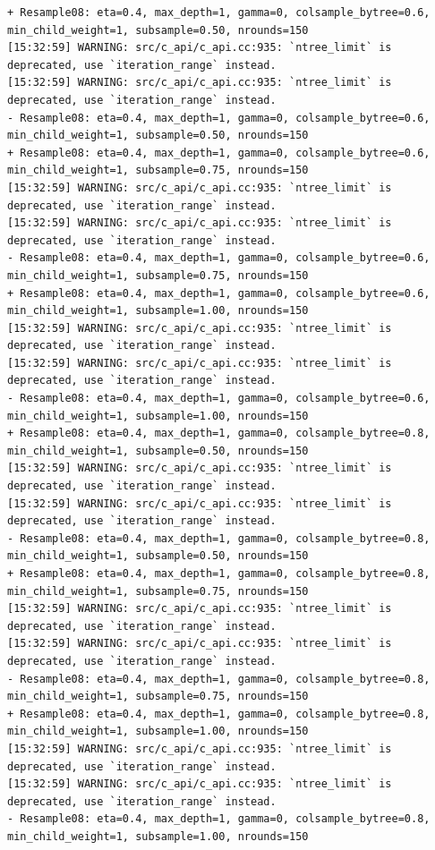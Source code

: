 \documentclass[
  letterpaper,
  DIV=11,
  numbers=noendperiod]{scrartcl}
\begin{document}
\begin{verbatim}
+ Resample08: eta=0.4, max_depth=1, gamma=0, colsample_bytree=0.6, min_child_weight=1, subsample=0.50, nrounds=150 
[15:32:59] WARNING: src/c_api/c_api.cc:935: `ntree_limit` is deprecated, use `iteration_range` instead.
[15:32:59] WARNING: src/c_api/c_api.cc:935: `ntree_limit` is deprecated, use `iteration_range` instead.
- Resample08: eta=0.4, max_depth=1, gamma=0, colsample_bytree=0.6, min_child_weight=1, subsample=0.50, nrounds=150 
+ Resample08: eta=0.4, max_depth=1, gamma=0, colsample_bytree=0.6, min_child_weight=1, subsample=0.75, nrounds=150 
[15:32:59] WARNING: src/c_api/c_api.cc:935: `ntree_limit` is deprecated, use `iteration_range` instead.
[15:32:59] WARNING: src/c_api/c_api.cc:935: `ntree_limit` is deprecated, use `iteration_range` instead.
- Resample08: eta=0.4, max_depth=1, gamma=0, colsample_bytree=0.6, min_child_weight=1, subsample=0.75, nrounds=150 
+ Resample08: eta=0.4, max_depth=1, gamma=0, colsample_bytree=0.6, min_child_weight=1, subsample=1.00, nrounds=150 
[15:32:59] WARNING: src/c_api/c_api.cc:935: `ntree_limit` is deprecated, use `iteration_range` instead.
[15:32:59] WARNING: src/c_api/c_api.cc:935: `ntree_limit` is deprecated, use `iteration_range` instead.
- Resample08: eta=0.4, max_depth=1, gamma=0, colsample_bytree=0.6, min_child_weight=1, subsample=1.00, nrounds=150 
+ Resample08: eta=0.4, max_depth=1, gamma=0, colsample_bytree=0.8, min_child_weight=1, subsample=0.50, nrounds=150 
[15:32:59] WARNING: src/c_api/c_api.cc:935: `ntree_limit` is deprecated, use `iteration_range` instead.
[15:32:59] WARNING: src/c_api/c_api.cc:935: `ntree_limit` is deprecated, use `iteration_range` instead.
- Resample08: eta=0.4, max_depth=1, gamma=0, colsample_bytree=0.8, min_child_weight=1, subsample=0.50, nrounds=150 
+ Resample08: eta=0.4, max_depth=1, gamma=0, colsample_bytree=0.8, min_child_weight=1, subsample=0.75, nrounds=150 
[15:32:59] WARNING: src/c_api/c_api.cc:935: `ntree_limit` is deprecated, use `iteration_range` instead.
[15:32:59] WARNING: src/c_api/c_api.cc:935: `ntree_limit` is deprecated, use `iteration_range` instead.
- Resample08: eta=0.4, max_depth=1, gamma=0, colsample_bytree=0.8, min_child_weight=1, subsample=0.75, nrounds=150 
+ Resample08: eta=0.4, max_depth=1, gamma=0, colsample_bytree=0.8, min_child_weight=1, subsample=1.00, nrounds=150 
[15:32:59] WARNING: src/c_api/c_api.cc:935: `ntree_limit` is deprecated, use `iteration_range` instead.
[15:32:59] WARNING: src/c_api/c_api.cc:935: `ntree_limit` is deprecated, use `iteration_range` instead.
- Resample08: eta=0.4, max_depth=1, gamma=0, colsample_bytree=0.8, min_child_weight=1, subsample=1.00, nrounds=150 

\end{verbatim}
\end{document}
